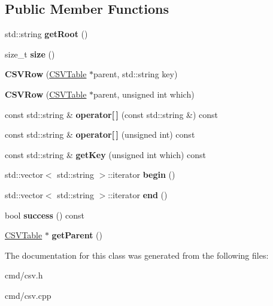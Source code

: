\subsection*{Public Member Functions}
\begin{DoxyCompactItemize}
\item 
std\+::string {\bfseries get\+Root} ()\hypertarget{classCSVRow_afd0b91abfa5faf60218538abd091d625}{}\label{classCSVRow_afd0b91abfa5faf60218538abd091d625}

\item 
size\+\_\+t {\bfseries size} ()\hypertarget{classCSVRow_aed86be159b0a0d4fca1749bda785d7f6}{}\label{classCSVRow_aed86be159b0a0d4fca1749bda785d7f6}

\item 
{\bfseries C\+S\+V\+Row} (\hyperlink{classCSVTable}{C\+S\+V\+Table} $\ast$parent, std\+::string key)\hypertarget{classCSVRow_aaa1a8da326ee33a4d0728eb4a5cf3b2e}{}\label{classCSVRow_aaa1a8da326ee33a4d0728eb4a5cf3b2e}

\item 
{\bfseries C\+S\+V\+Row} (\hyperlink{classCSVTable}{C\+S\+V\+Table} $\ast$parent, unsigned int which)\hypertarget{classCSVRow_a4bc171fd2ffc19ea705455334a993edf}{}\label{classCSVRow_a4bc171fd2ffc19ea705455334a993edf}

\item 
const std\+::string \& {\bfseries operator\mbox{[}$\,$\mbox{]}} (const std\+::string \&) const \hypertarget{classCSVRow_a7f200a688d77f319ce2aea84b5c3f5c1}{}\label{classCSVRow_a7f200a688d77f319ce2aea84b5c3f5c1}

\item 
const std\+::string \& {\bfseries operator\mbox{[}$\,$\mbox{]}} (unsigned int) const \hypertarget{classCSVRow_ac2d34b34fed947c347edc215b9eb2fe7}{}\label{classCSVRow_ac2d34b34fed947c347edc215b9eb2fe7}

\item 
const std\+::string \& {\bfseries get\+Key} (unsigned int which) const \hypertarget{classCSVRow_aef230b1ae84c3d8698364445c8481831}{}\label{classCSVRow_aef230b1ae84c3d8698364445c8481831}

\item 
std\+::vector$<$ std\+::string $>$\+::iterator {\bfseries begin} ()\hypertarget{classCSVRow_adceab7f86ad28bab8fe5be5cd51b657e}{}\label{classCSVRow_adceab7f86ad28bab8fe5be5cd51b657e}

\item 
std\+::vector$<$ std\+::string $>$\+::iterator {\bfseries end} ()\hypertarget{classCSVRow_a686e8fe9f86cfa9c6dd801e460204a52}{}\label{classCSVRow_a686e8fe9f86cfa9c6dd801e460204a52}

\item 
bool {\bfseries success} () const \hypertarget{classCSVRow_a5b1bdb9f939418e164f1459c14f57ada}{}\label{classCSVRow_a5b1bdb9f939418e164f1459c14f57ada}

\item 
\hyperlink{classCSVTable}{C\+S\+V\+Table} $\ast$ {\bfseries get\+Parent} ()\hypertarget{classCSVRow_a338775e96aece89b2794c089c7371c85}{}\label{classCSVRow_a338775e96aece89b2794c089c7371c85}

\end{DoxyCompactItemize}


The documentation for this class was generated from the following files\+:\begin{DoxyCompactItemize}
\item 
cmd/csv.\+h\item 
cmd/csv.\+cpp\end{DoxyCompactItemize}
